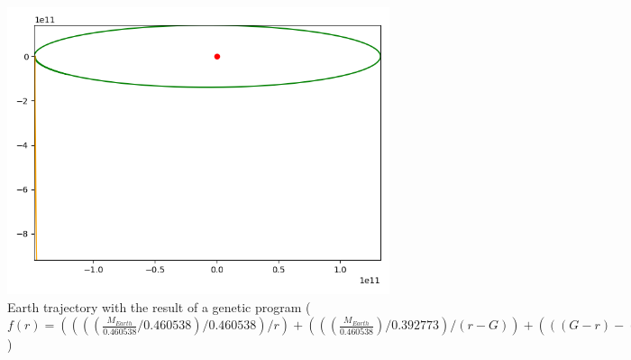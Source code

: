 \begin{figure}
    \center
    \includegraphics[scale=.3]{img/newton_gp_2.png}
    \caption{Earth trajectory with the result of a genetic program (\(f(r) =
        ((((\frac{M_{Earth}}{0.460538}/0.460538)/0.460538)/r)+(((\frac{M_{Earth}}{0.460538})/0.392773)/(r-G))+(((G-r)-(r+r))+(\frac{M_{Earth}}{0.460538})/(r-G)))))\))}
    \label{gp_3}
\end{figure}